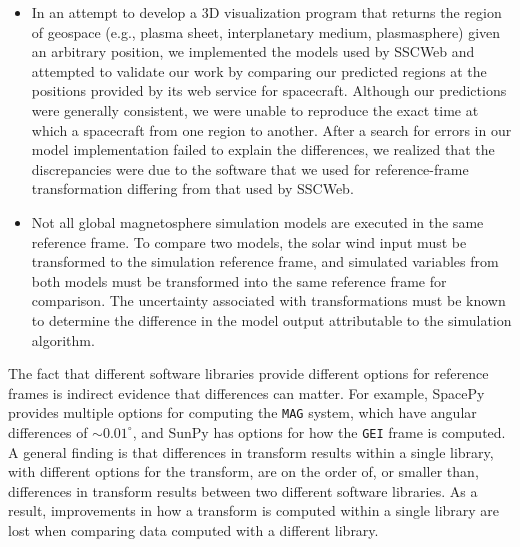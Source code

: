 \documentclass[draft]{agujournal2019}
\begin{document}
\begin{itemize}
\item In an attempt to develop a 3D visualization program that returns the region of geospace (e.g., plasma sheet, interplanetary medium, plasmasphere) given an arbitrary position, we implemented the models used by SSCWeb \cite{SSCWeb} and attempted to validate our work by comparing our predicted regions at the positions provided by its web service for spacecraft. Although our predictions were generally consistent, we were unable to reproduce the exact time at which a spacecraft  from one region to another. After a search for errors in our model implementation failed to explain the differences, we realized that the discrepancies were due to the software that we used for reference-frame transformation differing from that used by SSCWeb. 

\item Not all global magnetosphere simulation models are executed in the same reference frame. To compare two models, the solar wind input must be transformed to the simulation reference frame, and simulated variables from both models must be transformed into the same reference frame for comparison. The uncertainty associated with transformations must be known to determine the difference in the model output attributable to the simulation algorithm. 
\end{itemize}

The fact that different software libraries provide different options for reference frames is indirect evidence that differences can matter. For example, SpacePy \cite{SpacePy} provides multiple options for computing the \texttt{MAG} system, which have angular differences of ${\sim}0.01^\circ$, and SunPy \cite{SunPy} has options for how the \texttt{GEI} frame is computed. A general finding is that differences in transform results within a single library, with different options for the transform, are on the order of, or smaller than, differences in transform results between two different software libraries. As a result, improvements in how a transform is computed within a single library are lost when comparing data computed with a different library. 
\end{document}
